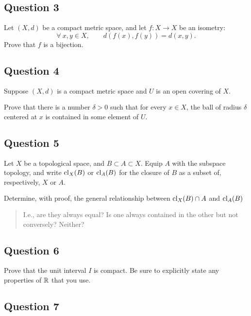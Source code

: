 \documentclass[12pt]{article}
\begin{document}
\hypertarget{question-3-3}{%
\subsection{Question 3}\label{question-3-3}}

Let \((X, d)\) be a compact metric space, and let \(f : X \to X\) be an
isometry: \[\forall~ x, y \in X, \qquad d(f (x), f (y)) = d(x, y).\]
Prove that \(f\) is a bijection.

\hypertarget{question-4-3}{%
\subsection{Question 4}\label{question-4-3}}

Suppose \((X, d)\) is a compact metric space and \(U\) is an open
covering of \(X\).

Prove that there is a number \(\delta > 0\) such that for every
\(x \in X\), the ball of radius \(\delta\) centered at \(x\) is
contained in some element of \(U\).

\hypertarget{question-5-3}{%
\subsection{Question 5}\label{question-5-3}}

Let \(X\) be a topological space, and \(B \subset A \subset X\). Equip
\(A\) with the subspace topology, and write \(\operatorname{cl}_X (B)\) or
\(\operatorname{cl}_A (B)\) for the closure of \(B\) as a subset of, respectively,
\(X\) or \(A\).

Determine, with proof, the general relationship between
\(\operatorname{cl}_X (B) \cap A\) and \(\operatorname{cl}_A (B)\)

\begin{quote}
I.e., are they always equal? Is one always contained in the other but
not conversely? Neither?
\end{quote}

\hypertarget{question-6-3}{%
\subsection{Question 6}\label{question-6-3}}

Prove that the unit interval \(I\) is compact. Be sure to explicitly
state any properties of \({\mathbb{R}}\) that you use.

\hypertarget{question-7-3}{%
\subsection{Question 7}\label{question-7-3}}
\end{document}

